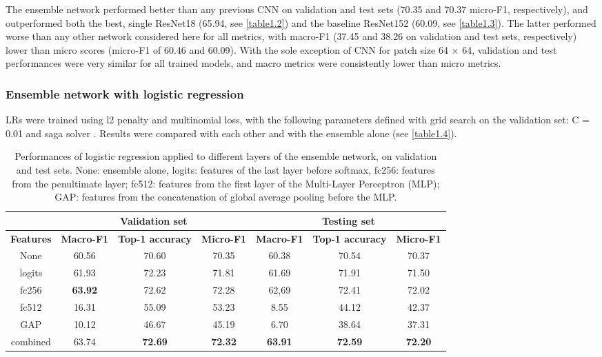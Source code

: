 The ensemble network performed better than any previous CNN on validation and test sets (70.35 and 70.37 micro-F1, respectively), and outperformed both the best, single ResNet18 (65.94, see \autoref{table1.2}) and the baseline ResNet152 (60.09, see \autoref{table1.3}). The latter performed worse than any other network considered here for all metrics, with macro-F1 (37.45 and 38.26 on validation and test sets, respectively) lower than micro scores (micro-F1 of 60.46 and 60.09). With the sole exception of CNN for patch size 64 × 64, validation and test performances were very similar for all trained models, and macro metrics were consistently lower than micro metrics.

\subsubsection{Ensemble network with logistic regression}\label{chapitre1_6.2.2}
LRs were trained using l2 penalty and multinomial loss, with the following parameters defined with grid search on the validation set: C = 0.01 and saga solver . Results were compared with each other and with the ensemble alone (see \autoref{table1.4}).

\begin{table}[htbp]
    \centering
      \caption[Performances of logistic regression applied to different layers of the ensemble network, on validation and test sets]{Performances of logistic regression applied to different layers of the ensemble network, on validation and test sets. None: ensemble alone, logits: features of the last layer before softmax, fc256: features from the penultimate layer; fc512: features from the first layer of the Multi-Layer Perceptron (MLP); GAP: features from the concatenation of global average pooling before the MLP.}
      \label{table1.4}
    \begin{tabular}{*{1}{c}|*{3}{c}|*{3}{c}}
    	\toprule
    	\textbf{} & \multicolumn{3}{c}{\textbf{Validation set}} & \multicolumn{3}{c}{\textbf{Testing set}}\\
    	\midrule
    	\textbf{Features} & \textbf{Macro-F1} & \textbf{Top-1 accuracy} & \textbf{Micro-F1} & \textbf{Macro-F1} & \textbf{Top-1 accuracy} & \textbf{Micro-F1}\\
    	\midrule%
    	None & 60.56 & 70.60 & 70.35 & 60.38 & 70.54 & 70.37\\
    	logits & 61.93 & 72.23 & 71.81 & 61.69 & 71.91 & 71.50\\
    	fc256 & \textbf{63.92} & 72.62 & 72.28 & 62,69 & 72.41 & 72.02\\
    	fc512 & 16.31 & 55.09 & 53.23 & 8.55 & 44.12 & 42.37\\
    	GAP & 10.12 & 46.67 & 45.19 & 6.70 & 38.64 & 37.31\\
    	combined & 63.74 & \textbf{72.69} & \textbf{72.32} & \textbf{63.91} & \textbf{72.59} & \textbf{72.20}\\
    	\bottomrule
    \end{tabular}
\end{table}

